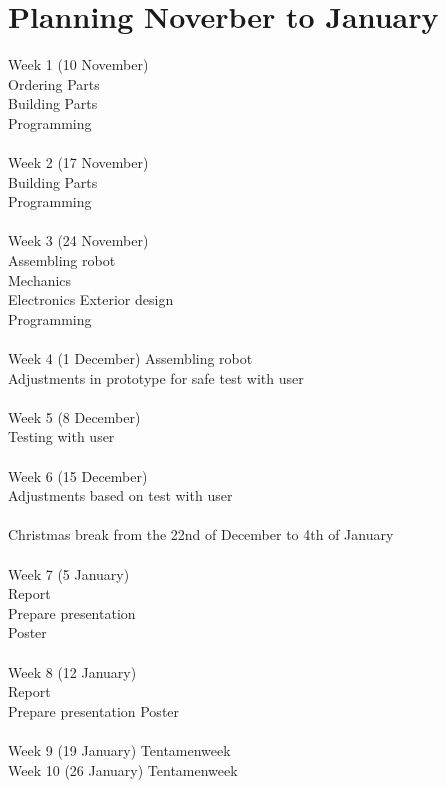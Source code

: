\documentclass[11pt,twoside,a4paper]{report}
\begin{document}
\chapter{Planning Noverber to January}
Week 1 (10 November)\\
Ordering Parts\\
Building Parts\\
Programming\\
\\
Week 2 (17 November)\\
Building Parts\\
Programming\\
\\
Week 3 (24 November)\\
Assembling robot\\
	Mechanics\\
	Electronics
	Exterior design\\
	Programming\\
\\
Week 4 (1 December)
Assembling robot\\
Adjustments in prototype for safe test with user\\
\\
Week 5 (8 December)\\
Testing with user\\
\\
Week 6 (15 December)\\
Adjustments based on test with user\\
\\
Christmas break from the 22nd of December to 4th of January\\
\\
Week 7 (5 January)\\
Report\\
Prepare presentation\\
Poster\\
\\
Week 8 (12 January)\\
Report\\
Prepare presentation
Poster\\
\\
Week 9 (19 January) Tentamenweek\\
Week 10 (26 January) Tentamenweek
\end{document}
